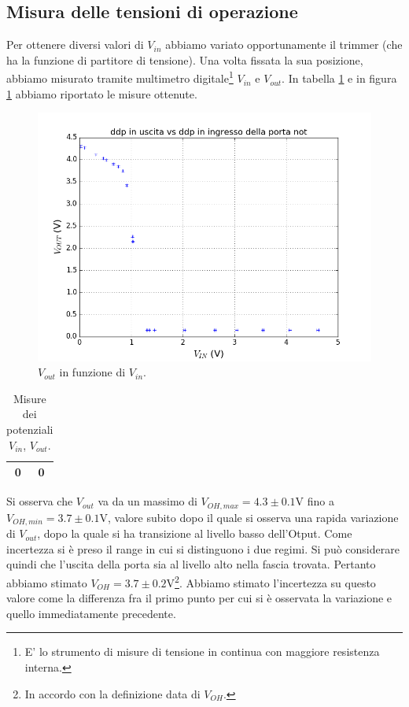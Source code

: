 \documentclass[10pt,a4paper]{article}
\begin{document}
\subsection{Misura delle tensioni di operazione}
Per ottenere diversi valori di $V_{in}$ abbiamo variato opportunamente il trimmer (che ha la funzione di partitore di tensione). Una volta fissata la sua posizione, abbiamo misurato tramite multimetro digitale\footnote{E' lo strumento di misure di tensione in continua con maggiore resistenza interna.} $V_{in}$ e $V_{out}$.
In tabella \ref{tab:vinvout} e in figura \ref{fig:vinvout} abbiamo riportato le misure ottenute.
\begin{figure}
\centering
\includegraphics[scale=0.9]{vinvout.png}
\caption{$V_{out}$ in funzione di $V_{in}$.\label{fig:vinvout}}
\end{figure}

\begin{table}
\centering
\begin{tabular}{|c|c|}
\hline
0 & 0\\
\hline
\end{tabular}
\caption{Misure dei potenziali $V_{in}$, $V_{out}$.\label{tab:vinvout}}
\end{table}
Si osserva che $V_{out}$ va da un massimo di $V_{OH,max}=4.3 \pm 0.1$V fino a 
$V_{OH,min}=3.7\pm 0.1$V, valore subito dopo il quale si osserva una rapida variazione di $V_{out}$, dopo la quale si ha transizione al livello basso dell'Otput. %
Come incertezza si è preso il range in cui si distinguono i due regimi.
Si può considerare quindi che l'uscita della porta sia al livello alto nella fascia trovata. Pertanto abbiamo stimato $V_{OH}=3.7\pm0.2$V\footnote{In accordo con la definizione data di $V_{OH}$.}. Abbiamo stimato l'incertezza su questo valore come la differenza fra il primo punto per cui si è osservata la variazione e quello immediatamente precedente.
\end{document}
